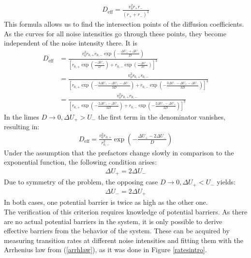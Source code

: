 \documentclass[12pt,a4paper]{article}
\begin{document}
\begin{align}\label{Deff}
D_{\text{eff}}=\frac{v_0^2 r_+r_-}{(r_++r_-)^3}
\end{align}
This formula allows us to find the intersection points of the diffusion coefficients. As the curves for all noise intensities go through these points, they become independent of the noise intensity there.
It is
\begin{align*}
D_{\text{eff}}&=\frac{v_0^2r_{0,+}r_{0,-}\exp\left(-\frac{\Delta U_++\Delta U_-}{D}\right)}{\left[r_{0,+}\exp(\frac{-\Delta U_+}{D})+r_{0,-}\exp\left(\frac{-\Delta U_-}{D}\right)\right]^3}\\&=\frac{v_0^2r_{0,+}r_{0,-}}{\left[r_{0,+}\exp\left(-\frac{3\Delta U_+-\Delta U_+-\Delta U_-}{3D}\right)+r_{0,-}\exp\left(-\frac{3\Delta U_--\Delta U_+ -\Delta U_-}{3D}\right)\right]^3}\\&=\frac{v_0^2r_{0,+}r_{0,-}}{\left[r_{0,+}\exp\left(-\frac{2\Delta U_+-\Delta U_-}{3D}\right)+r_{0,-}\exp\left(-\frac{2\Delta U_--\Delta U_+}{3D}\right)\right]^3}
\end{align*}
In the limes $D\rightarrow 0,\Delta U_+>U_-$ the first term in the denominator vanishes, resulting in:
\begin{align*}
D_{\text{eff}}=\frac{v_0^2r_{0,+}}{r_{0,-}^2}\exp\left(-\frac{\Delta U_+-2\Delta U_-}{D}\right)
\end{align*}
Under the assumption that the prefactors change slowly in comparison to the exponential function, the following condition arises:
\begin{align}\label{fcrit}
\Delta U_+=2\Delta U_-
\end{align}
Due to symmetry of the problem, the opposing case $D\rightarrow 0,\Delta U_+<U_-$ yields:
\begin{align*}
\Delta U_-=2\Delta U_+
\end{align*}
In both cases, one potential barrier is twice as high as the other one.\\
The verification of this criterion requires knowledge of potential barriers. As there are no actual potential barriers in the system, it is only possible to derive effective barriers from the behavior of the system.
These can be acquired by measuring transition rates at different noise intensities and fitting them with the Arrhenius law from (\ref{arrhlaw}), as it was done in Figure \ref{ratesintro}.
\end{document}
